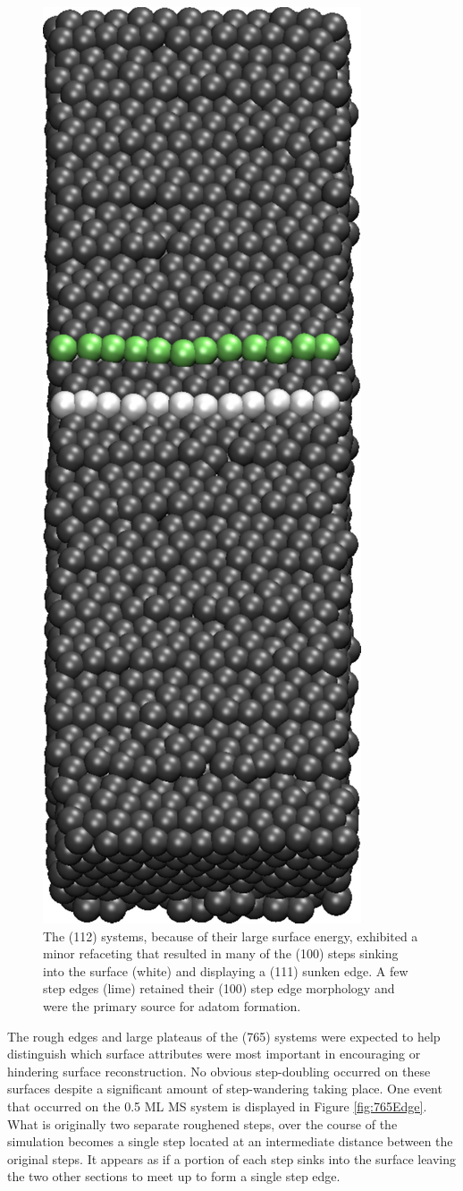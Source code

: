 \begin{figure}
\centering
\includegraphics[width=0.3\linewidth]{../figures/appB/112_sunken.pdf}
\caption{The (112) systems, because of their large surface energy, exhibited a
minor refaceting that resulted in many of the (100) steps sinking into
the surface (white) and displaying a (111) sunken edge. A few step edges (lime)
retained their (100) step edge morphology and were the primary source for adatom
formation.}
\label{fig:112sunken}
\end{figure}
\newpage



The rough edges and large plateaus of the (765) systems were expected to help
distinguish which surface attributes were most important in encouraging or
hindering surface reconstruction. No obvious step-doubling
occurred on these surfaces despite a significant amount of step-wandering
taking place. One event that occurred on the 0.5 ML MS system is displayed in
Figure \ref{fig:765Edge}. What is originally two separate roughened steps, over
the course of the simulation becomes a single step located at an intermediate
distance between the original steps. It appears as if a portion of each step
sinks into the surface leaving the two other sections to meet up to form a
single step edge.

